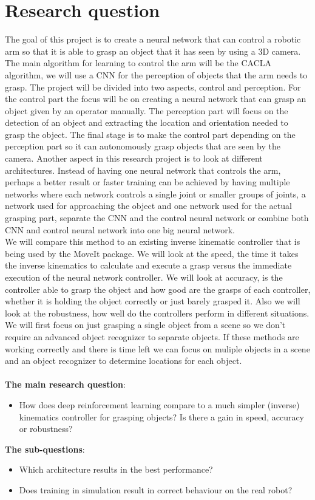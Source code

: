 \section{Research question}
The goal of this project is to create a neural network that can control a robotic arm so that it is able to grasp an object that it has seen by using a 3D camera. 
The main algorithm for learning to control the arm will be the CACLA algorithm, we will use a CNN for the perception of objects that the arm needs to grasp. 
The project will be divided into two aspects, control and perception. For the control part the focus will be on creating a neural network that can grasp an object given by an operator manually. The perception part 
will focus on the detection of an object and extracting the location and orientation needed to grasp the object. The final stage is to make the control part depending on the perception part so it can autonomously grasp objects
that are seen by the camera. Another aspect in this research project is to look at different architectures. Instead of having one neural network that controls the arm, perhaps a better result or faster training can be 
achieved by having multiple networks where each network controls a single joint or smaller groups of joints, a network used for approaching the object and one network used for the actual grasping part, separate the CNN and 
the control neural network or combine both CNN and control neural network into one big neural network. \\
We will compare this method to an existing inverse kinematic controller that is being used by the MoveIt package. We will look at the speed, the time it takes the inverse kinematics to calculate and execute a grasp versus the immediate
execution of the neural network controller. We will look at accuracy, is the controller able to grasp the object and how good are the grasps of each controller, whether it is holding the object correctly or just barely grasped it. 
Also we will look at the robustness, how well do the controllers perform in different situations. \\
We will first focus on just grasping a single object from a scene so we don't require an advanced object recognizer to separate objects. If these methods are working correctly and there is time left we can focus on muliple objects in 
a scene and an object recognizer to determine locations for each object.\\ \\
\textbf{The main research question}:    
\begin{itemize}
  \item  How does deep reinforcement learning compare to a much simpler (inverse) kinematics controller for grasping objects? Is there a gain in speed, accuracy or robustness?
\end{itemize}                                
\textbf{The sub-questions}: 
\begin{itemize}
  \item Which architecture results in the best performance? 
  \item Does training in simulation result in correct behaviour on the real robot?
\end{itemize}
